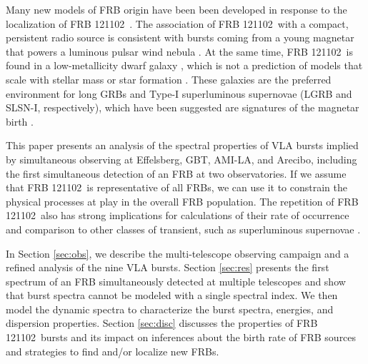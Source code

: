 \documentclass[twocolumn]{aastex61}
\newcommand{\frb}{FRB 121102}
\begin{document}
Many new models of FRB origin have been been developed in response to the localization of \frb\ \citep{2017arXiv170104815K, 2017arXiv170102370M, 2017arXiv170104094Z, 2017arXiv170102492D, 2017arXiv170208644B, 2017arXiv170300393T}. The association of \frb\ with a compact, persistent radio source is consistent with bursts coming from a young magnetar that powers a luminous pulsar wind nebula \citep{2017arXiv170104815K}. At the same time, \frb\ is found in a low-metallicity dwarf galaxy \citep{OPT, 2017arXiv170102370M}, which is not a prediction of models that scale with stellar mass or star formation \citep{2017arXiv170400022N}. These galaxies are the preferred environment for long GRBs and Type-I superluminous supernovae (LGRB and SLSN-I, respectively), which have been suggested are signatures of the magnetar birth \citep{2008AJ....135.1136M, 2014ApJ...787..138L}.


This paper presents an analysis of the spectral properties of VLA bursts implied by simultaneous observing at Effelsberg, GBT, AMI-LA, and Arecibo, including the first simultaneous detection of an FRB at two observatories. If we assume that \frb\ is representative of all FRBs, we can use it to constrain the physical processes at play in the overall FRB population. The repetition of \frb\ also has strong implications for calculations of their rate of occurrence \citep{2016MNRAS.458L..89C} and comparison to other classes of transient, such as superluminous supernovae \citep{OPT}.

In Section \ref{sec:obs}, we describe the multi-telescope observing campaign and a refined analysis of the nine VLA bursts. Section \ref{sec:res} presents the first spectrum of an FRB simultaneously detected at multiple telescopes and show that burst spectra cannot be modeled with a single spectral index. We then model the dynamic spectra to characterize the burst spectra, energies, and dispersion properties. Section \ref{sec:disc} discusses the properties of \frb\ bursts and its impact on inferences about the birth rate of FRB sources and strategies to find and/or localize new FRBs.
\end{document}
